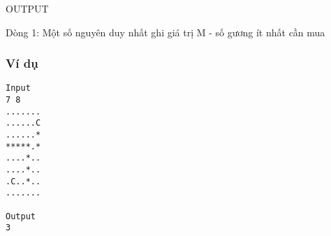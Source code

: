OUTPUT

Dòng 1: Một số nguyên duy nhất ghi giá trị M - số gương ít nhất cần mua

\subsubsection{Ví dụ}
\begin{verbatim}
Input
7 8
.......
......C
......*
*****.*
....*..
....*..
.C..*..
.......

Output
3
\end{verbatim}

 
